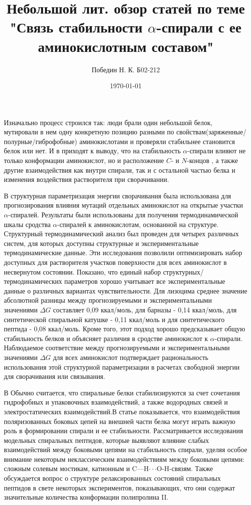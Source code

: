 \documentclass[a4paper,12pt]{article}
\author{Победин Н. К. Б02-212}
\title{Небольшой лит. обзор статей по теме "Связь стабильности $\alpha$-спирали с ее аминокислотным составом"}
\date{\today}
\begin{document}
	\maketitle
	Изначально процесс строился так: люди брали один небольшой белок, мутировали в нем одну конкретную позицию разными по свойствам(заряженные/полурные/гиброфобные) аминокислотами и проверяли стабильнее становится белок или нет. И в \cite{litlink1} приходят к выводу, что на стабильность $\alpha$-спирали влияют не только конформации аминокислот, но и расположение $C$- и $N$-концов , а также другие взаимодействия как внутри спирали, так и с остальной частью белка и изменения воздействия растворителя при сворачивании. 
	
	В \cite{litlink2} структурная параметризация энергии сворачивания была использована для прогнозирования влияния мутаций отдельных аминокислот на открытые участки $\alpha$-спиралей. Результаты были использованы для получения термодинамической шкалы сродства $\alpha$-спиралей к аминокислотам, основанной на структуре. Структурный термодинамический анализ был проведен для четырех различных систем, для которых доступны структурные и экспериментальные термодинамические данные. 
	Эти исследования позволили оптимизировать набор доступных для растворителя участков поверхности для всех аминокислот в несвернутом состоянии. Показано, что единый набор структурных/термодинамических параметров хорошо учитывает все экспериментальные данные о различных вариантах чувствительности. Для лизоцима среднее значение абсолютной разницы между прогнозируемыми и экспериментальными значениями $\Delta G$ составляет 0,09 ккал/моль, для барназы - 0,14 ккал/моль, для синтетической спиральной катушке - 0,11 ккал/моль и для синтетического пептида - 0,08 ккал/моль. Кроме того, этот подход хорошо предсказывает общую стабильность белков и объясняет различия в сродстве аминокислот к $\alpha$-спирали. Наблюдаемое соответствие между прогнозируемыми и экспериментальными значениями $\Delta G$ для всех аминокислот подтверждает рациональность использования этой структурной параметризации в расчетах свободной энергии для сворачивания или связывания.
	
	В \cite{litlink3} Обычно считается, что спиральные белки стабилизируются за счет сочетания гидрофобных и упаковочных взаимодействий, а также водородных связей и электростатических взаимодействий.В статье показывается, что взаимодействия поляризованных боковых цепей на внешней части белка могут играть важную роль в формировании спирали и ее стабильности. Рассматривается исследования модельных спиральных пептидов, которые выявляют влияние слабых взаимодействий между боковыми цепями на стабильность спирали, уделяя особое внимание некоторым неклассическим взаимодействиям между боковыми цепями: сложным солевым мостикам, катионным и C—H$\cdot \cdot \cdot$O-H-связям. Также обсуждается вопрос о структуре релаксированных состояний спиральных пептидов в свете некоторых экспериментов, показывающих, что они содержат значительные количества конформации полипролина II.
	
\end{document}

